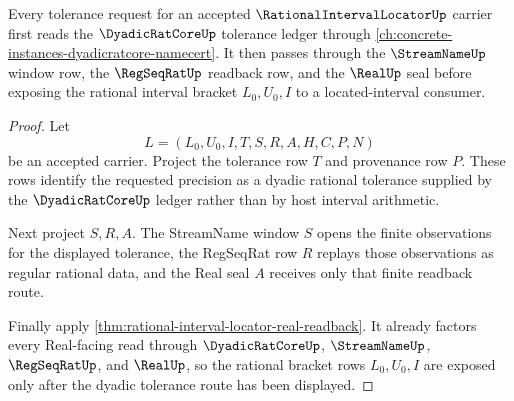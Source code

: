 \begin{theorem}
\label{thm:rational-interval-locator-dyadic-tolerance-route}
Every tolerance request for an accepted $\RationalIntervalLocatorUp$ carrier first reads the $\DyadicRatCoreUp$ tolerance ledger through \autoref{ch:concrete-instances-dyadicratcore-namecert}. It then passes through the $\StreamNameUp$ window row, the $\RegSeqRatUp$ readback row, and the $\RealUp$ seal before exposing the rational interval bracket $L_0,U_0,I$ to a located-interval consumer.
\end{theorem}
\begin{proof}
Let
$$
L=(L_0,U_0,I,T,S,R,A,H,C,P,N)
$$
be an accepted carrier. Project the tolerance row $T$ and provenance row $P$. These rows identify the requested precision as a dyadic rational tolerance supplied by the $\DyadicRatCoreUp$ ledger rather than by host interval arithmetic.

Next project $S,R,A$. The StreamName window $S$ opens the finite observations for the displayed tolerance, the RegSeqRat row $R$ replays those observations as regular rational data, and the Real seal $A$ receives only that finite readback route.

Finally apply \autoref{thm:rational-interval-locator-real-readback}. It already factors every Real-facing read through $\DyadicRatCoreUp$, $\StreamNameUp$, $\RegSeqRatUp$, and $\RealUp$, so the rational bracket rows $L_0,U_0,I$ are exposed only after the dyadic tolerance route has been displayed.
\end{proof}

